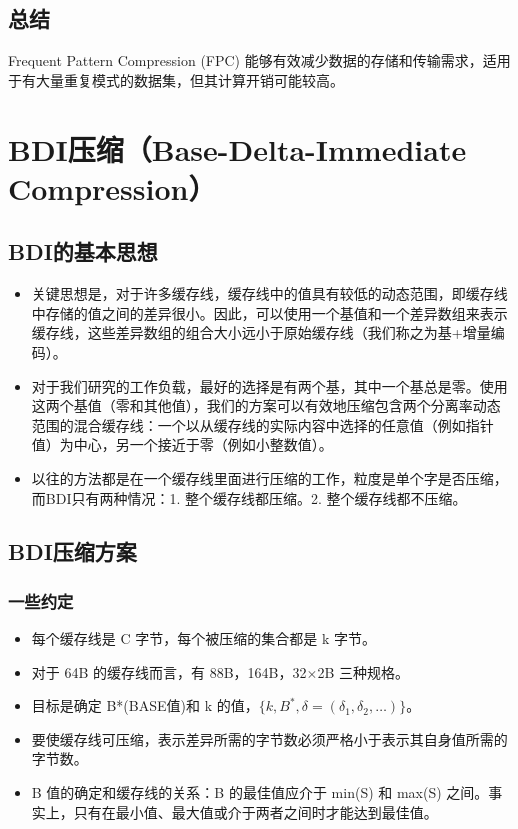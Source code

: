 \documentclass[12pt]{article}
\begin{document}
\subsection{总结}
Frequent Pattern Compression (FPC) 能够有效减少数据的存储和传输需求，适用于有大量重复模式的数据集，但其计算开销可能较高。


\section{BDI压缩（Base-Delta-Immediate Compression）}

\subsection{BDI的基本思想}

\begin{itemize}
    \item 关键思想是，对于许多缓存线，缓存线中的值具有较低的动态范围，即缓存线中存储的值之间的差异很小。因此，可以使用一个基值和一个差异数组来表示缓存线，这些差异数组的组合大小远小于原始缓存线（我们称之为基+增量编码）。
    \item 对于我们研究的工作负载，最好的选择是有两个基，其中一个基总是零。使用这两个基值（零和其他值），我们的方案可以有效地压缩包含两个分离率动态范围的混合缓存线：一个以从缓存线的实际内容中选择的任意值（例如指针值）为中心，另一个接近于零（例如小整数值）。
    \item 以往的方法都是在一个缓存线里面进行压缩的工作，粒度是单个字是否压缩，而BDI只有两种情况：1. 整个缓存线都压缩。2. 整个缓存线都不压缩。
\end{itemize}

\subsection{BDI压缩方案}

\subsubsection{一些约定}

\begin{itemize}
    \item 每个缓存线是 C 字节，每个被压缩的集合都是 k 字节。
    \item 对于 64B 的缓存线而言，有 88B，164B，32$\times$2B 三种规格。
    \item 目标是确定 B*(BASE值)和 k 的值，$\{k,B^*,\delta = (\delta_1,\delta_2,\dots)\}$。
    \item 要使缓存线可压缩，表示差异所需的字节数必须严格小于表示其自身值所需的字节数。
    \item B 值的确定和缓存线的关系：B 的最佳值应介于 min(S) 和 max(S) 之间。事实上，只有在最小值、最大值或介于两者之间时才能达到最佳值。
\end{itemize}
\end{document}

